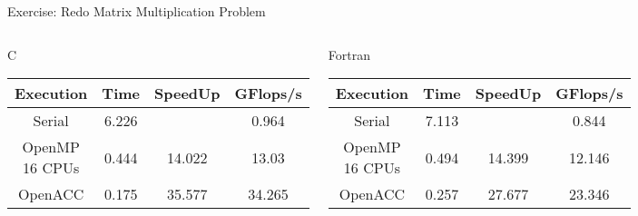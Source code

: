\documentclass[c,mathserif,compress,xcolor=svgnames]{beamer}
\newenvironment{eblock}[0]
{
\begin{beamerboxesrounded}[upper=uppercol2,lower=lowercol2,shadow=true]}
{\end{beamerboxesrounded}}
\begin{document}
\begin{frame}[allowframebreaks]{\small Exercise: Redo Matrix Multiplication Problem}
  \begin{columns}
    \begin{eblock}{C}
      \begin{tabular}{|c|c|c|c|}
        \hline
        Execution & Time & SpeedUp & GFlops/s \\
        \hline
        Serial & 6.226 &  & 0.964 \\
        OpenMP 16 CPUs & 0.444 & 14.022 & 13.03 \\
        OpenACC & 0.175 & 35.577 & 34.265 \\
        \hline
      \end{tabular}
    \end{eblock}
    \begin{eblock}{Fortran}
      \begin{tabular}{|c|c|c|c|}
        \hline
        Execution & Time & SpeedUp & GFlops/s \\
        \hline
        Serial & 7.113 & & 0.844 \\
        OpenMP 16 CPUs & 0.494 & 14.399 & 12.146 \\
        OpenACC & 0.257 & 27.677 & 23.346 \\
        \hline
      \end{tabular}
    \end{eblock}
  \end{columns}
  \begin{columns}
    \begin{eblock}{}
      
    \end{eblock}
    \begin{eblock}{}
      
    \end{eblock}
  \end{columns}
\end{frame}
\end{document}
